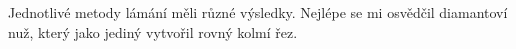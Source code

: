 Jednotlivé metody lámání měli různé výsledky.
Nejlépe se mi osvědčil diamantoví nuž, který jako jediný vytvořil rovný kolmí řez.